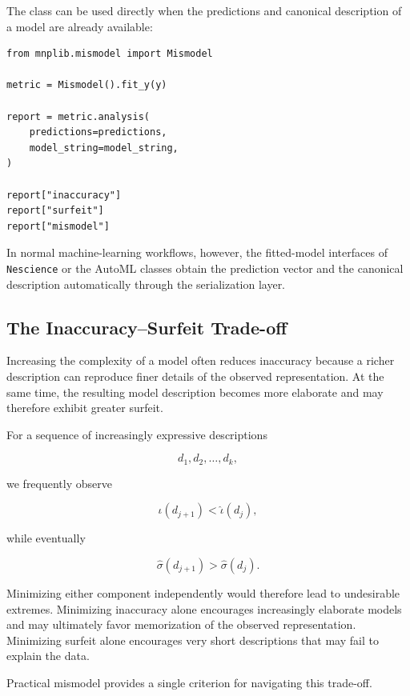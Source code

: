 The class can be used directly when the predictions and canonical description
of a model are already available:

\begin{sourcecode}
{\scriptsize
\begin{verbatim}
from mnplib.mismodel import Mismodel

metric = Mismodel().fit_y(y)

report = metric.analysis(
    predictions=predictions,
    model_string=model_string,
)

report["inaccuracy"]
report["surfeit"]
report["mismodel"]
\end{verbatim}}
\end{sourcecode}

In normal machine-learning workflows, however, the fitted-model interfaces of
\texttt{Nescience} or the AutoML classes obtain the prediction vector and the
canonical description automatically through the serialization layer.

\subsection*{The Inaccuracy--Surfeit Trade-off}

Increasing the complexity of a model often reduces inaccuracy because a richer
description can reproduce finer details of the observed representation. At the
same time, the resulting model description becomes more elaborate and may
therefore exhibit greater surfeit.

For a sequence of increasingly expressive descriptions

\[
d_1,d_2,\ldots,d_k,
\]

we frequently observe

\[
\widehat\iota(d_{j+1})
<
\widehat\iota(d_j),
\]

while eventually

\[
\widehat\sigma(d_{j+1})
>
\widehat\sigma(d_j).
\]

Minimizing either component independently would therefore lead to undesirable
extremes. Minimizing inaccuracy alone encourages increasingly elaborate models
and may ultimately favor memorization of the observed representation.
Minimizing surfeit alone encourages very short descriptions that may fail to
explain the data.

Practical mismodel provides a single criterion for navigating this trade-off.

